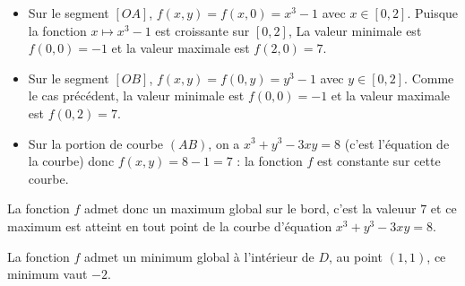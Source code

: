 \begin{enumerate}
\begin{enumerate}
{\begin{itemize}
    			\item Sur le segment $[OA]$, $f(x,y) = f(x,0) = x^3 - 1$ avec $x \in [0,2]$. Puisque la fonction $x \mapsto x^3-1$ est croissante sur $[0,2]$, La valeur minimale est $f(0,0) = -1$ et la valeur maximale est $f(2,0) = 7$. 
    			\item Sur le segment $[OB]$, $f(x,y) = f(0,y) = y^3 - 1$ avec $y \in [0,2]$. Comme le cas précédent, la valeur minimale est $f(0,0) = -1$ et la valeur maximale est $f(0,2) = 7$.
    			\item Sur la portion de courbe $(AB)$, on a $x^3 + y^3 - 3xy = 8$  (c'est l'équation de la courbe) donc $f(x,y) = 8-1 = 7$ : la fonction $f$ est constante sur cette courbe. 
    		\end{itemize}	
    	La fonction $f$ admet donc un maximum global sur le bord, c'est la valeuur $7$ et ce maximum est atteint en tout point de la courbe d'équation $x^3 + y^3 - 3xy = 8$. 
    	
    	La fonction $f$ admet un minimum global à l'intérieur de $D$, au point $(1,1)$, ce minimum vaut $-2$.
     }
    \end{enumerate}
\end{enumerate}